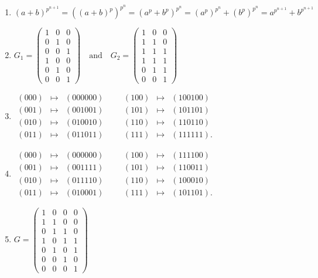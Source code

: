 \documentclass[oneside,10pt,]{article}
\begin{document}
\begin{enumerate}
\item{}\(\displaystyle (a + b)^{p^{n + 1}} = ((a + b)^p)^{p^{n}} = (a^p + b^p)^{p^{n}} = (a^p)^{p^{n}} + (b^p)^{p^{n}} = a^{p^{n + 1}} + b^{p^{n + 1}}\)%
\item{}\(\displaystyle G_1 = \begin{pmatrix} 1 & 0 & 0 \\ 0 & 1 & 0 \\ 0 & 0 & 1 \\ 1 & 0 & 0 \\ 0 & 1 & 0 \\ 0 & 0 & 1 \end{pmatrix} \quad \text{and} \quad G_2 = \begin{pmatrix} 1 & 0 & 0 \\ 1 & 1 & 0 \\ 1 & 1 & 1 \\ 1 & 1 & 1 \\ 0 & 1 & 1 \\ 0 & 0 & 1 \end{pmatrix}\)%
\item{}\(\displaystyle \begin{array}{rclccrcl} (000) & \mapsto & (000000) & & & (100) & \mapsto & (100100) \\ (001) & \mapsto & (001001) & & & (101) & \mapsto & (101101) \\ (010) & \mapsto & (010010) & & & (110) & \mapsto & (110110) \\ (011) & \mapsto & (011011) & & & (111) & \mapsto & (111111). \end{array}\)%
\item{}\(\displaystyle \begin{array}{rclccrcl} (000) & \mapsto & (000000) & & & (100) & \mapsto & (111100) \\ (001) & \mapsto & (001111) & & & (101) & \mapsto & (110011) \\ (010) & \mapsto & (011110) & & & (110) & \mapsto & (100010) \\ (011) & \mapsto & (010001) & & & (111) & \mapsto & (101101). \end{array}\)%
\item{}\(\displaystyle G = \begin{pmatrix} 1 & 0 & 0 & 0 \\ 1 & 1 & 0 & 0 \\ 0 & 1 & 1 & 0 \\ 1 & 0 & 1 & 1 \\ 0 & 1 & 0 & 1 \\ 0 & 0 & 1 & 0 \\ 0 & 0 & 0 & 1 \end{pmatrix}\)%

\end{enumerate}
\end{document}
